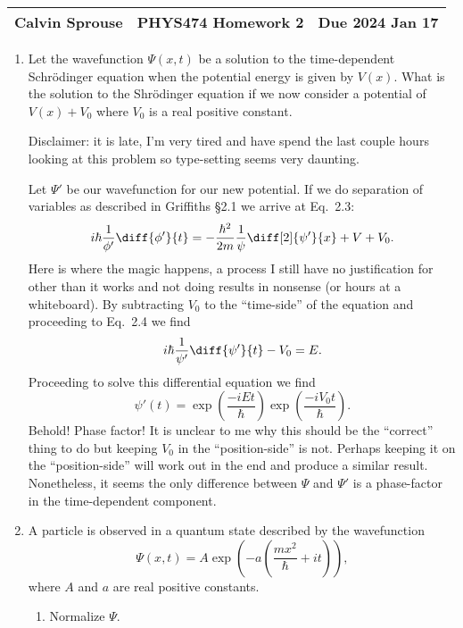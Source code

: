 \documentclass[a4paper, 12pt]{config/homework}
\begin{document}
\noindent
\begin{tabularx}{\textwidth}{>{\centering\arraybackslash}X>{\centering\arraybackslash}X>{\centering\arraybackslash}X}
Calvin Sprouse & PHYS474 Homework 2 & Due 2024 Jan 17\\
\midrule
\end{tabularx}

\begin{enumerate}
\item Let the wavefunction \(\Psi(x,t)\) be a solution to the time-dependent Schr{\"o}dinger equation when the potential energy is given by \(V(x)\). What is the solution to the Shr{\"o}dinger equation if we now consider a potential of \(V(x) + V_0\) where \(V_0\) is a real positive constant.

Disclaimer: it is late, I'm very tired and have spend the last couple hours looking at this problem so type-setting seems very daunting.

Let \(\Psi'\) be our wavefunction for our new potential. If we do separation of variables as described in Griffiths \S 2.1 we arrive at Eq.\ 2.3:
\[i\hbar \frac{1}{\phi'} \diff{\phi'}{t} = -\frac{\hbar^2}{2m} \frac{1}{\psi} \diff[2]{\psi'}{x} + V + V_0.\]
Here is where the magic happens, a process I still have no justification for other than it works and not doing results in nonsense (or hours at a whiteboard). By subtracting \(V_0\) to the ``time-side'' of the equation and proceeding to Eq.\ 2.4 we find
\[i\hbar \frac{1}{\psi'} \diff{\psi'}{t} - V_0 = E.\]
Proceeding to solve this differential equation we find
\[\psi'(t) = \exp\left(\frac{-iEt}{\hbar}\right)\exp\left(\frac{-i V_0 t}{\hbar}\right).\]
Behold! Phase factor! It is unclear to me why this should be the ``correct'' thing to do but keeping \(V_0\) in the ``position-side'' is not. Perhaps keeping it on the ``position-side'' will work out in the end and produce a similar result. Nonetheless, it seems the only difference between \(\Psi \) and \(\Psi' \) is a phase-factor in the time-dependent component.

\pagebreak
\item A particle is observed in a quantum state described by the wavefunction
\[\Psi(x,t) = A\exp\left(-a\left(\frac{mx^2}{\hbar}+it\right)\right),\]
where \(A\) and \(a\) are real positive constants.
\begin{enumerate}[label = (\alph*)]

\item Normalize \(\Psi \).


\end{enumerate}
\end{enumerate}
\end{document}
